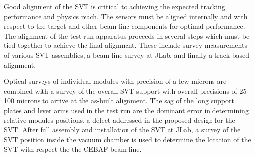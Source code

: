 Good alignment of the SVT is critical to achieving the expected tracking performance and physics reach. 
The sensors must be aligned internally and with respect to the target and other beam line components for optimal performance. 
The alignment of the test run apparatus proceeds in several steps which must be tied together to achieve the final alignment.
These include survey measurements of various SVT assemblies, a beam line survey at JLab, and finally 
a track-based alignment. 

Optical surveys of individual modules with precision of a few microns are combined with a survey of the
overall SVT support with overall precisions of 25-100 microns to arrive at the as-built alignment.  The sag
of the long support plates and lever arms used in the test run are the dominant error in determining
relative modules positions, a defect addressed in the proposed design for the SVT.
After full assembly and installation of the SVT at JLab, a survey of the SVT position inside the vacuum chamber
is used to determine the location of the SVT with respect the the CEBAF beam line.


